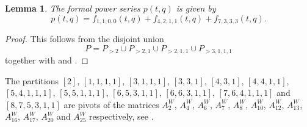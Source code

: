 \documentclass[a4paper, 12pt, reqno]{amsart}
\newtheorem{lemma}[theorem]{Lemma}
\theoremstyle{remark}
\begin{document}
\begin{lemma}
  \label{lmm:13}
  The formal power series $p(t, q)$ is given by
  \begin{equation*}
    p(t, q) = f_{1, 1, 0, 0}(t, q) + f_{4, 2, 1, 1}(t, q) + f_{7, 3, 3, 3}(t, q).
  \end{equation*}
\end{lemma}

\begin{proof}
  This follows from the disjoint union
  \begin{equation*}
    P = P_{>2} \cup P_{>2, 1} \cup P_{>2, 1, 1} \cup P_{>3, 1, 1, 1}
  \end{equation*}
  together with  and .
\end{proof}

The partitions $[2]$, $[1, 1, 1, 1]$, $[3, 1, 1, 1]$, $[3, 3, 1]$, $[4, 3, 1]$, $[4, 4, 1, 1]$, $[5, 4, 1, 1, 1]$, $[5, 5, 1, 1, 1]$, $[6, 5, 3, 1, 1]$, $[6, 6, 3, 1, 1]$, $[7, 6, 4, 1, 1, 1]$ and $[8, 7, 5, 3, 1, 1]$ are pivots of the matrices $A^W_2$, $A^W_4$, $A^W_6$, $A^W_7$, $A^W_8$, $A^W_{10}$, $A^W_{12}$, $A^W_{13}$, $A^W_{16}$, $A^W_{17}$, $A^W_{20}$ and $A^W_{25}$ respectively, see \cite[ising-modules-1-16.ipynb]{sagemath2}.



\end{document}

